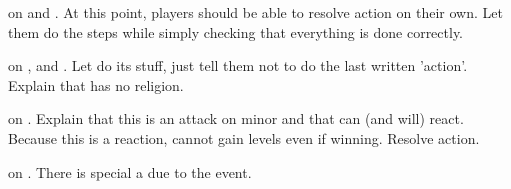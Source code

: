 \aparag \TUR on \paysAlgerie and \paysDamas.
\bparag At this point, players should be able to resolve action on their
own. Let them do the steps while simply checking that everything is done
correctly.

\aparag \HIS on \paysPapaute, \paysSuisse and \paysLorraine.
\bparag Let \HIS do its stuff, just tell them not to do the last written
'action'.
\bparag Explain that \paysSuisse has no religion.

\aparag \FRA on \paysGenes.
\bparag Explain that this is an attack on \HIS minor and that \HIS can (and
will) react. Because this is a reaction, \HIS cannot gain levels even if
winning.
\bparag Resolve action.

\aparag \FRA on \paysToscane.
\bparag There is special a  due to the event.


